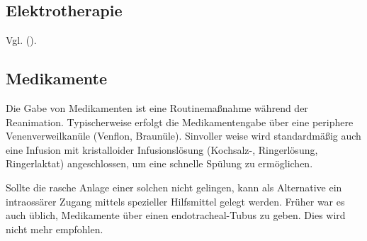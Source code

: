 \subsection{Elektrotherapie}

Vgl. \CO{[BLS]} ().


\subsection{Medikamente}
%
%
%
Die Gabe von Medikamenten ist eine Routinemaßnahme während
der Reanimation. Typischerweise erfolgt die Medikamentengabe
über eine periphere Venenverweilkanüle
(Venflon{\texttrademark}, Braunüle{\texttrademark}).
Sinvoller weise wird standardmäßig auch eine Infusion mit
kristalloider Infusionslösung (Kochsalz-,
Ringerlösung, Ringerlaktat) angeschlossen, um eine schnelle
Spülung zu ermöglichen.

Sollte
die rasche Anlage einer solchen nicht gelingen, kann als
Alternative ein intraossärer Zugang mittels spezieller
Hilfsmittel gelegt werden.
Früher war es auch üblich, Medikamente über einen
endotracheal-Tubus zu geben. Dies wird nicht mehr
empfohlen.

